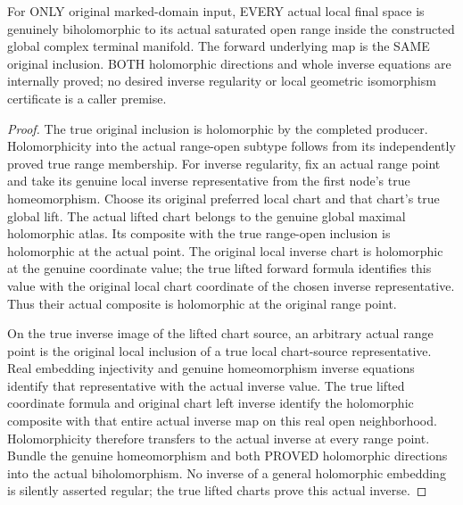 \begin{theorem}
\label{hir:original-terminal-local-actual-saturated-range-biholomorphism}
\leanok
{}
For ONLY original marked-domain input, EVERY actual local final space is
genuinely biholomorphic to its actual saturated open range inside the
constructed global complex terminal manifold. The forward underlying map
is the SAME original inclusion. BOTH holomorphic directions and whole
inverse equations are internally proved; no desired inverse regularity
or local geometric isomorphism certificate is a caller premise.
\end{theorem}
\begin{proof}
The true original inclusion is holomorphic by the completed producer.
Holomorphicity into the actual range-open subtype follows from its
independently proved true range membership. For inverse regularity,
fix an actual range point and take its genuine local inverse representative
from the first node's true homeomorphism. Choose its original preferred
local chart and that chart's true global lift. The actual lifted chart
belongs to the genuine global maximal holomorphic atlas. Its composite
with the true range-open inclusion is holomorphic at the actual point.
The original local inverse chart is holomorphic at the genuine coordinate
value; the true lifted forward formula identifies this value with the
original local chart coordinate of the chosen inverse representative.
Thus their actual composite is holomorphic at the original range point.

On the true inverse image of the lifted chart source, an arbitrary
actual range point is the original local inclusion of a true local
chart-source representative. Real embedding injectivity and genuine
homeomorphism inverse equations identify that representative with the
actual inverse value. The true lifted coordinate formula and original
chart left inverse identify the holomorphic composite with that entire
actual inverse map on this real open neighborhood. Holomorphicity therefore
transfers to the actual inverse at every range point. Bundle the genuine
homeomorphism and both PROVED holomorphic directions into the actual
biholomorphism. No inverse of a general holomorphic embedding is silently
asserted regular; the true lifted charts prove this actual inverse.
\end{proof}

